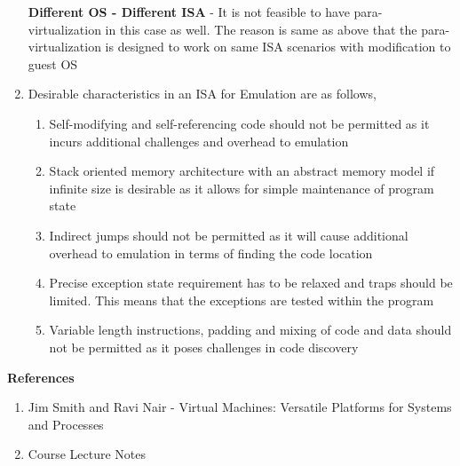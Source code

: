 \documentclass[11pt,a4paper,oneside]{article}
\begin{document}
\begin{enumerate}
		\textbf{Different OS - Different ISA} - It is not feasible to have para-virtualization in this case as well. The reason is same as above that the para-virtualization is designed to work on same ISA scenarios with modification to guest OS
		
		\item Desirable characteristics in an ISA for Emulation are as follows,
		      \begin{enumerate}
		      	\item Self-modifying and self-referencing code should not be permitted as it incurs additional challenges and overhead to emulation
		      	\item Stack oriented memory architecture with an abstract memory model if infinite size is desirable as it allows for simple maintenance of program state
		      	\item Indirect jumps should not be permitted as it will cause additional overhead to emulation in terms of finding the code location
		      	\item Precise exception state requirement has to be relaxed and traps should be limited. This means that the exceptions are tested within the program
		      	\item Variable length instructions, padding and mixing of code and data should not be permitted as it poses challenges in code discovery	      	
		      \end{enumerate}
		    
	\end{enumerate}
    
    \textbf{References}
    \begin{enumerate}
    	\item Jim Smith and Ravi Nair - Virtual Machines: Versatile Platforms for Systems and Processes 
    	\item Course Lecture Notes   	
    \end{enumerate}
 

    
\end{document}
